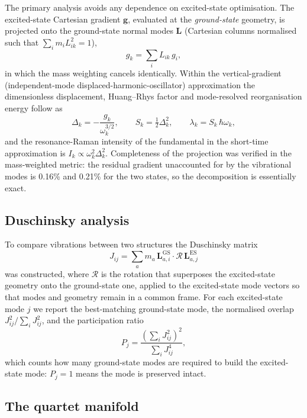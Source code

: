 \documentclass[11pt,a4paper]{article}
\begin{document}
The primary analysis avoids any dependence on excited-state optimisation. The
excited-state Cartesian gradient $\mathbf{g}$, evaluated at the \emph{ground-state}
geometry, is projected onto the ground-state normal modes
$\mathbf{L}$ (Cartesian columns normalised such that $\sum_i m_i L_{ik}^2 = 1$),
\begin{equation}
g_k = \sum_i L_{ik}\, g_i ,
\end{equation}
in which the mass weighting cancels identically. Within the
vertical-gradient (independent-mode displaced-harmonic-oscillator)
approximation the dimensionless displacement, Huang--Rhys factor and
mode-resolved reorganisation energy follow as
\begin{equation}
\Delta_k = -\frac{g_k}{\omega_k^{3/2}}, \qquad
S_k = \tfrac{1}{2}\Delta_k^{2}, \qquad
\lambda_k = S_k\,\hbar\omega_k ,
\end{equation}
and the resonance-Raman intensity of the fundamental in the short-time
approximation is $I_k \propto \omega_k^{2}\Delta_k^{2}$. Completeness of the
projection was verified in the mass-weighted metric: the residual gradient
unaccounted for by the vibrational modes is 0.16\% and 0.21\% for the two
states, so the decomposition is essentially exact.

\subsection*{Duschinsky analysis}

To compare vibrations between two structures the Duschinsky matrix
\begin{equation}
J_{ij} = \sum_a m_a\, \mathbf{L}^{\mathrm{GS}}_{a,i}\cdot
          \mathcal{R}\,\mathbf{L}^{\mathrm{ES}}_{a,j}
\end{equation}
was constructed, where $\mathcal{R}$ is the rotation that superposes the
excited-state geometry onto the ground-state one, applied to the excited-state
mode vectors so that modes and geometry remain in a common frame. For each
excited-state mode $j$ we report the best-matching ground-state mode, the
normalised overlap $J_{ij}^2/\sum_i J_{ij}^2$, and the participation ratio
\begin{equation}
P_j = \frac{\left(\sum_i J_{ij}^{2}\right)^{2}}{\sum_i J_{ij}^{4}},
\end{equation}
which counts how many ground-state modes are required to build the
excited-state mode: $P_j = 1$ means the mode is preserved intact.

\subsection*{The quartet manifold}
\end{document}
